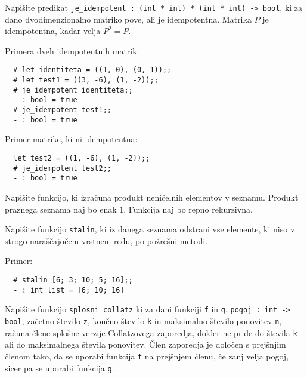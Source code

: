 \documentclass[arhiv]{../izpit}
\begin{document}
	


\naloga

\podnaloga
Napišite predikat \verb|je_idempotent : (int * int) * (int * int) -> bool|,
   ki za dano dvodimenzionalno matriko pove, ali je idempotentna.
   Matrika $P$ je idempotentna, kadar velja $P^2 = P$.

  
Primera dveh idempotentnih matrik:
\begin{verbatim}
  # let identiteta = ((1, 0), (0, 1));;
  # let test1 = ((3, -6), (1, -2));;
  # je_idempotent identiteta;;
  - : bool = true
  # je_idempotent test1;;
  - : bool = true
\end{verbatim}

Primer matrike, ki ni idempotentna:
\begin{verbatim}
  let test2 = ((1, -6), (1, -2));;
  # je_idempotent test2;;
  - : bool = true
 \end{verbatim}
  
\podnaloga
Napišite funkcijo, ki izračuna produkt neničelnih elementov v seznamu.
Produkt praznega seznama naj bo enak $1$. Funkcija naj bo repno rekurzivna.
  

\podnaloga
Napišite funkcijo \verb|stalin|, ki iz danega seznama odstrani vse elemente, 
ki niso v strogo naraščajočem vrstnem redu, po požrešni metodi.

Primer:
\begin{verbatim}
  # stalin [6; 3; 10; 5; 16];;
  - : int list = [6; 10; 16]
\end{verbatim}


  \podnaloga
  Napišite funkcijo \verb|splosni_collatz| ki za dani funkciji \verb|f| in \verb|g|, \verb|pogoj : int -> bool|, 
  začetno število \verb|z|, končno število \verb|k| in maksimalno število ponovitev \verb|n|, 
  računa člene splošne verzije Collatzovega zaporedja, dokler ne pride do števila \verb|k| 
  ali do maksimalnega števila ponovitev.
  Člen zaporedja je določen s prejšnjim členom tako, da se uporabi funkcija \verb|f| na prejšnjem členu,
  če zanj velja pogoj, sicer pa se uporabi funkcija \verb|g|.  
\end{document}
